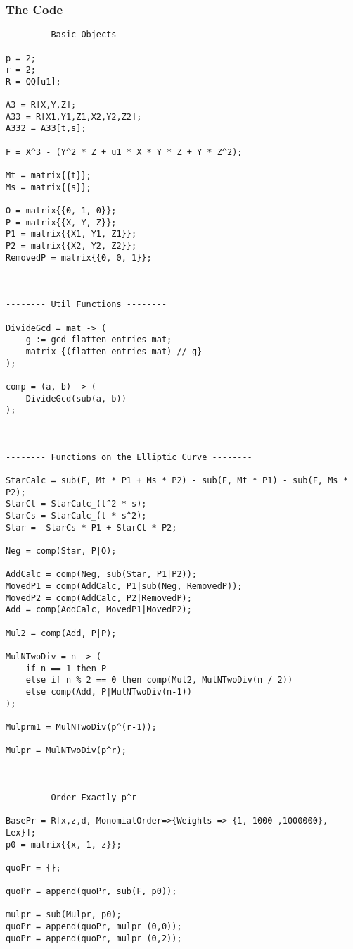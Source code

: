 \subsubsection{The Code}

\begin{lstlisting}
-------- Basic Objects --------

p = 2;
r = 2;
R = QQ[u1];

A3 = R[X,Y,Z];
A33 = R[X1,Y1,Z1,X2,Y2,Z2];
A332 = A33[t,s];

F = X^3 - (Y^2 * Z + u1 * X * Y * Z + Y * Z^2);

Mt = matrix{{t}};
Ms = matrix{{s}};

O = matrix{{0, 1, 0}};
P = matrix{{X, Y, Z}};
P1 = matrix{{X1, Y1, Z1}};
P2 = matrix{{X2, Y2, Z2}};
RemovedP = matrix{{0, 0, 1}};



-------- Util Functions --------

DivideGcd = mat -> (
	g := gcd flatten entries mat;
	matrix {(flatten entries mat) // g}
);

comp = (a, b) -> (
	DivideGcd(sub(a, b))
);



-------- Functions on the Elliptic Curve --------

StarCalc = sub(F, Mt * P1 + Ms * P2) - sub(F, Mt * P1) - sub(F, Ms * P2);
StarCt = StarCalc_(t^2 * s);
StarCs = StarCalc_(t * s^2);
Star = -StarCs * P1 + StarCt * P2;

Neg = comp(Star, P|O);

AddCalc = comp(Neg, sub(Star, P1|P2));
MovedP1 = comp(AddCalc, P1|sub(Neg, RemovedP));
MovedP2 = comp(AddCalc, P2|RemovedP);
Add = comp(AddCalc, MovedP1|MovedP2);

Mul2 = comp(Add, P|P);

MulNTwoDiv = n -> (
	if n == 1 then P
	else if n % 2 == 0 then comp(Mul2, MulNTwoDiv(n / 2))
	else comp(Add, P|MulNTwoDiv(n-1))
);

Mulprm1 = MulNTwoDiv(p^(r-1));

Mulpr = MulNTwoDiv(p^r);



-------- Order Exactly p^r --------

BasePr = R[x,z,d, MonomialOrder=>{Weights => {1, 1000 ,1000000}, Lex}];
p0 = matrix{{x, 1, z}};

quoPr = {};

quoPr = append(quoPr, sub(F, p0));

mulpr = sub(Mulpr, p0);
quoPr = append(quoPr, mulpr_(0,0));
quoPr = append(quoPr, mulpr_(0,2));


\end{lstlisting}
